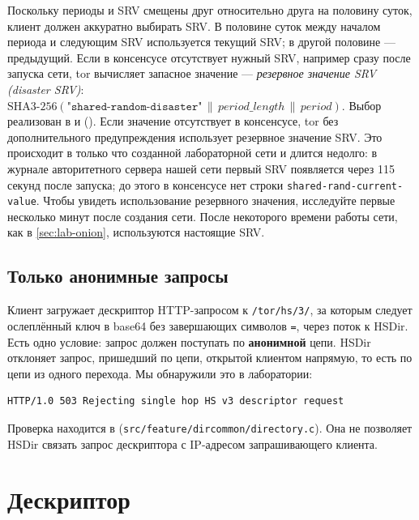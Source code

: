 \begin{approfondimento}
Поскольку периоды и SRV смещены друг относительно друга на половину суток, клиент должен аккуратно выбирать SRV. В половине суток между началом периода и следующим SRV используется текущий SRV; в другой половине — предыдущий. Если в консенсусе отсутствует нужный SRV, например сразу после запуска сети, tor вычисляет запасное значение — \emph{резервное значение SRV (disaster SRV)}: $\mathrm{SHA3\text{-}256}(\texttt{"shared-random-disaster"} \,\|\, \mathit{period\_length} \,\|\, \mathit{period})$. Выбор реализован в  и  (). Если значение отсутствует в консенсусе, tor без дополнительного предупреждения использует резервное значение SRV. Это происходит в только что созданной лабораторной сети и длится недолго: в журнале авторитетного сервера нашей сети первый SRV появляется через 115 секунд после запуска; до этого в консенсусе нет строки \texttt{shared-rand-current-value}. Чтобы увидеть использование резервного значения, исследуйте первые несколько минут после создания сети. После некоторого времени работы сети, как в \cref{sec:lab-onion}, используются настоящие SRV.
\end{approfondimento}

\subsection{Только анонимные запросы}

Клиент загружает дескриптор HTTP-запросом к \nolinkurl{/tor/hs/3/}, за которым следует ослеплённый ключ в base64 без завершающих символов \texttt{=}, через поток  к HSDir. Есть одно условие: запрос должен поступать по \textbf{анонимной} цепи. HSDir отклоняет запрос, пришедший по цепи, открытой клиентом напрямую, то есть по цепи из одного перехода. Мы обнаружили это в лаборатории:
\begin{lstlisting}[numbers=none]
HTTP/1.0 503 Rejecting single hop HS v3 descriptor request
\end{lstlisting}
Проверка находится в  (\nolinkurl{src/feature/dircommon/directory.c}). Она не позволяет HSDir связать запрос дескриптора с IP-адресом запрашивающего клиента.

\section{Дескриптор}\label{sec:os-descrittore}

